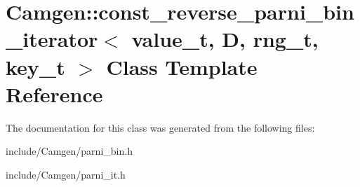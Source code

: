 \hypertarget{a00099}{}\section{Camgen\+:\+:const\+\_\+reverse\+\_\+parni\+\_\+bin\+\_\+iterator$<$ value\+\_\+t, D, rng\+\_\+t, key\+\_\+t $>$ Class Template Reference}
\label{a00099}


The documentation for this class was generated from the following files\+:\begin{DoxyCompactItemize}
\item 
include/\+Camgen/parni\+\_\+bin.\+h\item 
include/\+Camgen/parni\+\_\+it.\+h\end{DoxyCompactItemize}
